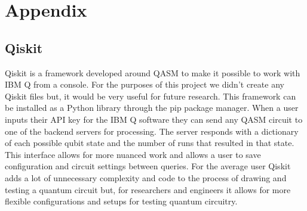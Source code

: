 \documentclass[12pt]{article}
\begin{document}
    


\newpage

\section{Appendix}
\subsection{Qiskit}
        Qiskit is a framework developed around QASM to make it possible to work with IBM Q from a console. For the purposes of this project we didn't create any Qiskit files but, it would be very useful for future research. This framework can be installed as a Python library through the pip package manager. When a user inputs their API key for the IBM Q software they can send any QASM circuit to one of the backend servers for processing. The server responds with a dictionary of each possible qubit state and the number of runs that resulted in that state. This interface allows for more nuanced work and allows a user to save configuration and circuit settings between queries. For the average user Qiskit adds a lot of unnecessary complexity and code to the process of drawing and testing a quantum circuit but, for researchers and engineers it allows for more flexible configurations and setups for testing quantum circuitry.
\end{document}

